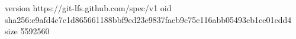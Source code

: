 version https://git-lfs.github.com/spec/v1
oid sha256:e9afd4c7c1d865661188bbf9ed23e9837facb9c75c116abb05493cb1ce01cdd4
size 5592560
